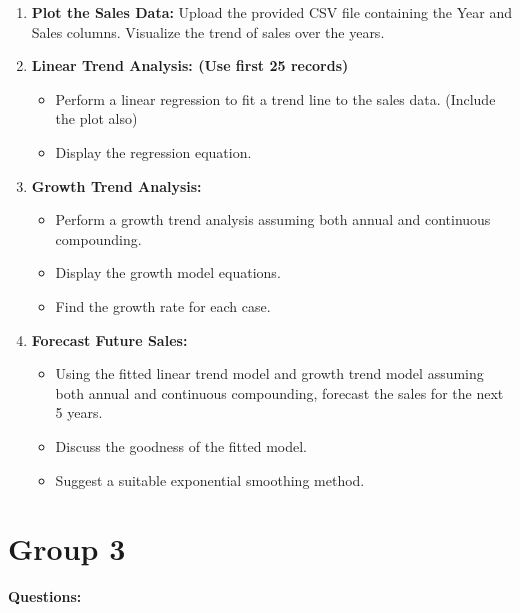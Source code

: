 \documentclass{article}
\begin{document}
\begin{enumerate}
    \item \textbf{Plot the Sales Data:} 
    Upload the provided CSV file containing the Year and Sales columns. Visualize the trend of sales over the years.

    \item \textbf{Linear Trend Analysis: (Use first 25 records)}
    \begin{itemize}
        \item Perform a linear regression to fit a trend line to the sales data. (Include the plot also)
        \item Display the regression equation.
    \end{itemize}

    \item \textbf{Growth Trend Analysis:}
    \begin{itemize}
        \item Perform a growth trend analysis assuming both annual and continuous compounding.
        \item Display the growth model equations.
        \item Find the growth rate for each case.
    \end{itemize}

    \item \textbf{Forecast Future Sales:}
    \begin{itemize}
        \item Using the fitted linear trend model and growth trend model assuming both annual and continuous compounding, forecast the sales for the next 5 years.
        \item Discuss the goodness of the fitted model.
        \item Suggest a suitable exponential smoothing method.
    \end{itemize}
\end{enumerate}

\section*{Group 3}

\textbf{Questions:}
\end{document}
